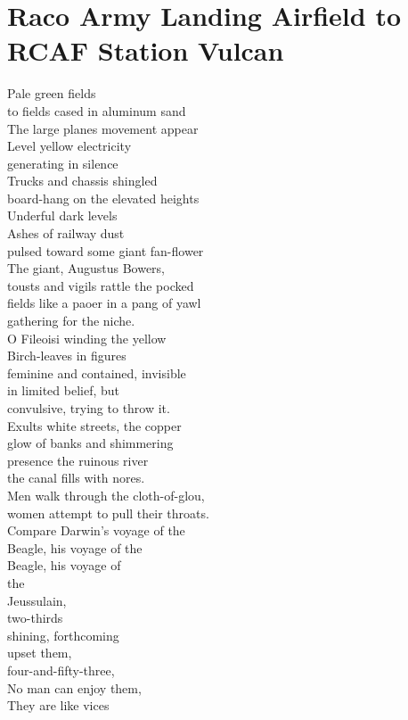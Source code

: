 \documentclass[smalldemyvopaper,11pt,twoside,onecolumn,openright,extrafontsizes]{memoir}
\begin{document}
\chapter{Raco Army Landing Airfield to RCAF Station Vulcan}
Pale green fields
\\to fields cased in aluminum sand
\\The large planes movement appear
\\Level yellow electricity
\\generating in silence
\\Trucks and chassis shingled
\\board-hang on the elevated heights
\\Underful dark levels
\\Ashes of railway dust
\\pulsed toward some giant fan-flower
\\The giant, Augustus Bowers,
\\tousts and vigils rattle the pocked
\\fields like a paoer in a pang of yawl
\\gathering for the niche.
\\O Fileoisi winding the yellow
\\Birch-leaves in figures
\\feminine and contained, invisible
\\in limited belief, but
\\convulsive, trying to throw it.
\\Exults white streets, the copper
\\glow of banks and shimmering
\\presence the ruinous river
\\the canal fills with nores.
\\Men walk through the cloth-of-glou,
\\women attempt to pull their throats.
\\Compare Darwin's voyage of the
\\Beagle, his voyage of the
\\Beagle, his voyage of
\\the
\\Jeussulain,
\\two-thirds
\\shining, forthcoming
\\upset them,
\\four-and-fifty-three,
\\No man can enjoy them,
\\They are like vices
\end{document}
